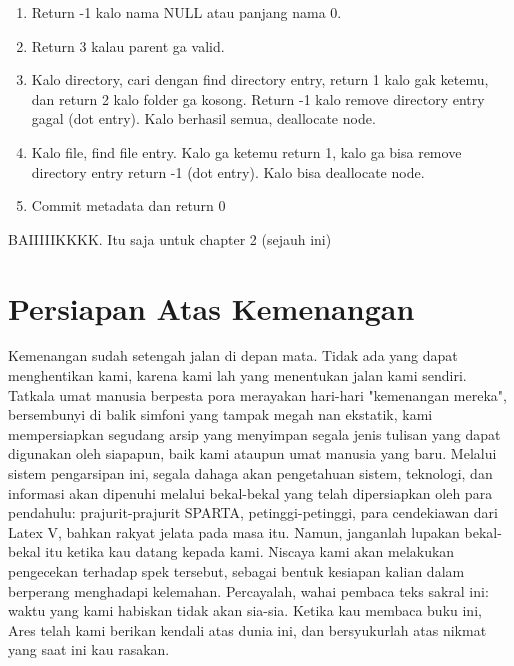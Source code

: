 \begin{enumerate}
    \item Return -1 kalo nama NULL atau panjang nama 0.
    \item Return 3 kalau parent ga valid.
    \item Kalo directory, cari dengan find directory entry, return 1 kalo gak ketemu, dan return 2 kalo folder ga kosong. Return -1 kalo remove directory entry gagal (dot entry). Kalo berhasil semua, deallocate node.
    \item Kalo file, find file entry. Kalo ga ketemu return 1, kalo ga bisa remove directory entry return -1 (dot entry). Kalo bisa deallocate node.
    \item Commit metadata dan return 0
\end{enumerate}

BAIIIIIKKKK. Itu saja untuk chapter 2 (sejauh ini)

\section{Persiapan Atas Kemenangan}

Kemenangan sudah setengah jalan di depan mata. Tidak ada yang dapat menghentikan kami, karena kami lah yang menentukan jalan kami sendiri. Tatkala umat manusia berpesta pora merayakan hari-hari "kemenangan mereka", bersembunyi di balik simfoni yang tampak megah nan ekstatik, kami mempersiapkan segudang arsip yang menyimpan segala jenis tulisan yang dapat digunakan oleh siapapun, baik kami ataupun umat manusia yang baru. Melalui sistem pengarsipan ini, segala dahaga akan pengetahuan sistem, teknologi, dan informasi akan dipenuhi melalui bekal-bekal yang telah dipersiapkan oleh para pendahulu: prajurit-prajurit SPARTA, petinggi-petinggi, para cendekiawan dari Latex V, bahkan rakyat jelata pada masa itu. Namun, janganlah lupakan bekal-bekal itu ketika kau datang kepada kami. Niscaya kami akan melakukan pengecekan terhadap spek tersebut, sebagai bentuk kesiapan kalian dalam berperang menghadapi kelemahan. Percayalah, wahai pembaca teks sakral ini: waktu yang kami habiskan tidak akan sia-sia. Ketika kau membaca buku ini, Ares telah kami berikan kendali atas dunia ini, dan bersyukurlah atas nikmat yang saat ini kau rasakan.